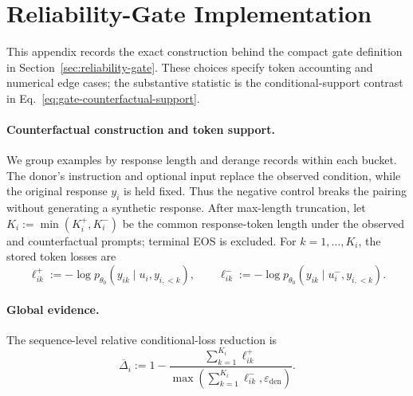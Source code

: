 \appendix
\vspace{-0.8em}
\section{Reliability-Gate Implementation}
\label{app:gate-implementation}
This appendix records the exact construction behind the compact gate
definition in Section~\ref{sec:reliability-gate}. These choices specify
token accounting and numerical edge cases; the substantive statistic is
the conditional-support contrast in Eq.~\eqref{eq:gate-counterfactual-support}.

\paragraph{Counterfactual construction and token support.}
We group examples by response length and derange records within each
bucket. The donor's instruction and optional input replace the observed
condition, while the original response \(y_i\) is held fixed. Thus the
negative control breaks the pairing without generating a synthetic
response. After max-length truncation, let
\(K_i:=\min(K_i^+,K_i^-)\) be the common response-token length under the
observed and counterfactual prompts; terminal EOS is excluded. For
\(k=1,\ldots,K_i\), the stored token losses are
\begin{equation}
  \ell_{ik}^{+}:=-\log p_{\theta_0}(y_{ik}\mid u_i,y_{i,<k}),
  \qquad
  \ell_{ik}^{-}:=-\log p_{\theta_0}(y_{ik}\mid u_i^-,y_{i,<k}).
  \label{eq:app-gate-token-nll}
\end{equation}

\paragraph{Global evidence.}
The sequence-level relative conditional-loss reduction is
\begin{equation}
  \overline{\Delta}_i
  :=1-
  \frac{\sum_{k=1}^{K_i}\ell_{ik}^{+}}
       {\max\!\left(\sum_{k=1}^{K_i}\ell_{ik}^{-},
                     \varepsilon_{\mathrm{den}}\right)}.
  \label{eq:app-gate-global-gain}
\end{equation}

